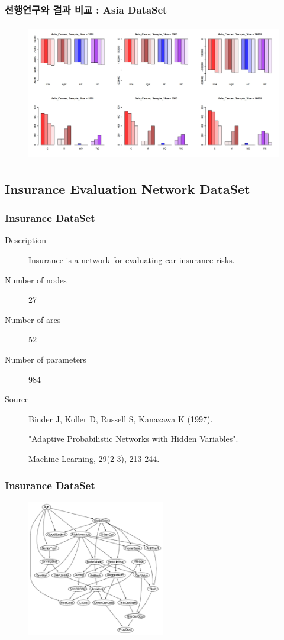 \documentclass{beamer}
\begin{document}
\begin{frame}
\frametitle{선행연구와 결과 비교 : Asia DataSet}
{\scriptsize{}
	\begin{figure}
		\includegraphics[height=170pt]{images/Real_1_Asia}
	\end{figure}	
}
\end{frame}



\subsection{Insurance Evaluation Network DataSet}
\begin{frame}
\frametitle{Insurance DataSet}
{\scriptsize{}
\begin{description}
	\item[Description] Insurance is a network for evaluating car insurance risks.
	
	\item[Number of nodes] 27
	
	\item[Number of arcs] 52
	
	\item[Number of parameters] 984
	
	\item[Source]  Binder J, Koller D, Russell S, Kanazawa K (1997).

	 "Adaptive Probabilistic Networks with Hidden Variables".
	 
	  Machine Learning, 29(2-3), 213-244.
\end{description}
}
\end{frame}


\begin{frame}
\frametitle{Insurance DataSet}
{\scriptsize{}
	\begin{figure}
		\includegraphics[height=170pt]{images/image02}
	\end{figure}	
}
\end{frame}
\end{document}

